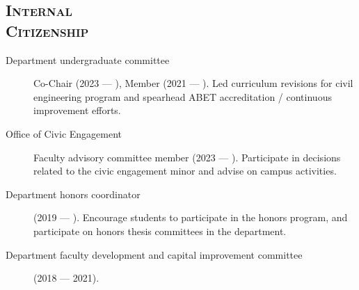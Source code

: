 \documentclass[margin,line]{res}
\newcommand{\secfont}{\scshape }
\begin{document}
\begin{resume}
\section{\secfont Internal \\ Citizenship}
\begin{description}
  \item[Department undergraduate committee] Co-Chair (2023 --- ), Member (2021 --- ). Led curriculum revisions for civil engineering program and spearhead ABET accreditation / continuous improvement efforts.
  \item[Office of Civic Engagement] Faculty advisory committee member (2023 --- ). Participate in decisions related to the civic engagement minor and advise on campus activities.
  \item[Department honors coordinator] (2019 --- ). Encourage students to
  participate in the honors program, and participate on honors thesis committees
  in the department.
  \item[Department faculty development and capital improvement committee] (2018 --- 2021).
\end{description}






\end{resume}
\end{document}
